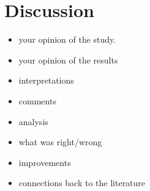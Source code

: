 \documentclass[a4paper,11pt]{article}
\begin{document}
\section{Discussion} \label{sec:Discussion}

\begin{itemize}
   \item
     your opinion of the study.
   \item
     your opinion of the results
   \item
     interpretations
   \item
     comments
   \item
     analysis
   \item
     what was right/wrong
   \item
     improvements
   \item
     connections back to the literature
\end{itemize}
\end{document}

